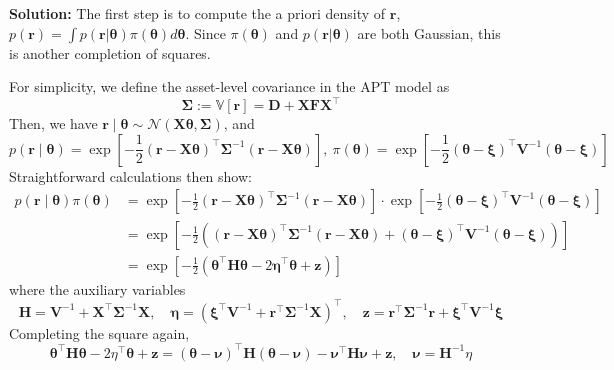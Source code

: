 \documentclass[13pt]{article}
\theoremstyle{definition}
\newenvironment{solution}
{\color{C2}\begin{framed}\begingroup\textbf{Solution:} }
  {\endgroup\end{framed}}
\theoremstyle{remark}
\begin{document}
\begin{solution}
The first step is to compute the a priori density of $\bm{r}$, $p(\boldsymbol{r})=\int p(\boldsymbol{r} | \boldsymbol{\theta}) \pi(\boldsymbol{\theta}) d \boldsymbol{\theta}$. 
Since $\pi(\boldsymbol{\theta})$ and $p(\boldsymbol{r} | \boldsymbol{\theta})$ are both Gaussian, this is another completion of squares.

For simplicity, we define the asset-level covariance in the APT model as 
\[
\mathbf{\Sigma}:=\mathbb{V}[\bm{r}]=\mathbf{D}+\mathbf{X} \mathbf{F} \mathbf{X}^{\top}
\]
Then, we have $\boldsymbol{r} \mid \boldsymbol{\theta} \sim \mathcal{N}\left(\mathbf{X} \boldsymbol{\theta}, \mathbf{\Sigma}\right)$, and 
\[
p(\boldsymbol{r} \mid \boldsymbol{\theta}) = \exp \left[-\frac{1}{2}(\boldsymbol{r}-\mathbf{X} \boldsymbol{\theta})^{\top} \mathbf{\Sigma}^{-1}(\boldsymbol{r}-\mathbf{X}\boldsymbol{\theta})\right],~ \pi(\boldsymbol{\theta}) = \exp \left[-\frac{1}{2}(\boldsymbol{\theta}-\boldsymbol{\xi})^{\top} \mathbf{V}^{-1}(\boldsymbol{\theta}-\boldsymbol{\xi})\right]
\]
Straightforward calculations then show:
$$
\begin{aligned}
p(\boldsymbol{r} \mid \boldsymbol{\theta}) \pi(\boldsymbol{\theta}) & =\exp \left[-\frac{1}{2}(\boldsymbol{r}-\mathbf{X} \boldsymbol{\theta})^{\top} \mathbf{\Sigma}^{-1}(\boldsymbol{r}-\mathbf{X}\boldsymbol{\theta})\right]\cdot \exp \left[-\frac{1}{2}(\boldsymbol{\theta}-\boldsymbol{\xi})^{\top} \mathbf{V}^{-1}(\boldsymbol{\theta}-\boldsymbol{\xi})\right] \\
& =\exp\left[-\frac{1}{2}\left((\boldsymbol{r}-\mathbf{X} \boldsymbol{\theta})^{\top} \mathbf{\Sigma}^{-1}(\boldsymbol{r}-\mathbf{X} \boldsymbol{\theta})+(\boldsymbol{\theta}-\boldsymbol{\xi})^{\top} \mathbf{V}^{-1}(\boldsymbol{\theta}-\boldsymbol{\xi})\right)\right] \\
& =\exp\left[-\frac{1}{2}\left(\boldsymbol{\theta}^{\top} \mathbf{H} \boldsymbol{\theta}-2 \boldsymbol{\eta}^{\top} \boldsymbol{\theta}+\boldsymbol{z}\right)\right]
\end{aligned}
$$
where the auxiliary variables
$$
\mathbf{H}=\boldsymbol{V}^{-1}+\mathbf{X}^{\top} \mathbf{\Sigma}^{-1} \mathbf{X}, \quad \boldsymbol{\eta}=\left(\boldsymbol{\xi}^{\top} \boldsymbol{V}^{-1}+\boldsymbol{r}^{\top} \mathbf{\Sigma}^{-1} \mathbf{X}\right)^{\top}, \quad \boldsymbol{z}=\boldsymbol{r}^{\top} \mathbf{\Sigma}^{-1} \boldsymbol{r}+\boldsymbol{\xi}^{\top} \boldsymbol{V}^{-1} \boldsymbol{\xi}
$$
Completing the square again,
$$
\boldsymbol{\theta}^{\top} \mathbf{H} \boldsymbol{\theta}-2 \eta^{\top} \boldsymbol{\theta}+\boldsymbol{z}=(\boldsymbol{\theta}-\bm{\nu})^{\top} \mathbf{H}(\boldsymbol{\theta}-\bm{\nu})-\bm{\nu}^{\top} \mathbf{H} \bm{\nu}+\boldsymbol{z}, \quad \bm{\nu}=\mathbf{H}^{-1} \eta
$$
\end{solution}
\end{document}
